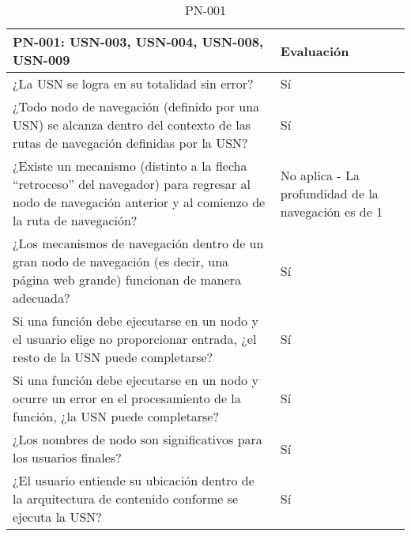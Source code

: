 \begin{table}[htpb]
\centering
\begin{tabularx}{\textwidth}{|X|X|}
\hline
\rowcolor[gray]{0.9}\textbf{PN-001: USN-003, USN-004, USN-008, USN-009}                                                                                                         & \textbf{Evaluación}                                 \\ \hline
¿La USN se logra en su totalidad sin error?                                                                                                                & Sí                                                  \\ \hline
¿Todo nodo de navegación (definido por una USN) se alcanza dentro del contexto de las rutas de navegación definidas por la USN?                            & Sí                                                  \\ \hline
¿Existe un mecanismo (distinto a la flecha ``retroceso'' del navegador) para regresar al nodo de navegación anterior y al comienzo de la ruta de navegación? & No aplica - La profundidad de la navegación es de 1 \\ \hline
¿Los mecanismos de navegación dentro de un gran nodo de navegación (es decir, una página web grande) funcionan de manera adecuada?                         & Sí                                                  \\ \hline
Si una función debe ejecutarse en un nodo y el usuario elige no proporcionar entrada, ¿el resto de la USN puede completarse?                               & Sí                                                  \\ \hline
Si una función debe ejecutarse en un nodo y ocurre un error en el procesamiento de la función, ¿la USN puede completarse?                                  & Sí                                                  \\ \hline
¿Los nombres de nodo son significativos para los usuarios finales?                                                                                         & Sí                                                  \\ \hline
¿El usuario entiende su ubicación dentro de la arquitectura de contenido conforme se ejecuta la USN?                                                       & Sí                                                  \\ \hline
\end{tabularx}
\caption{PN-001}
\end{table}


